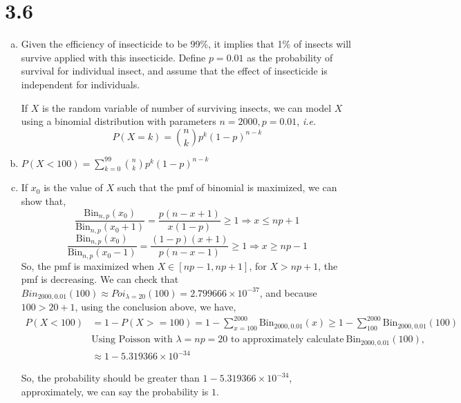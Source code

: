 \documentclass[letterpaper]{article}
\begin{document}
    \section*{3.6}
    \begin{enumerate}[(a)]
    \item Given the efficiency of insecticide to be 99\%, it implies that 1\% of insects will survive applied with this insecticide. Define $p = 0.01$ as the probability of survival for individual insect, and assume that the effect of insecticide is independent for individuals. 
    
    If $X$ is the random variable of number of surviving insects, we can model $X$ using a binomial distribution with parameters $n = 2000, p =0.01$, \emph{i.e.}
    \[
    P(X=k) = \binom{n}{k} p^k(1-p)^{n-k}
    \]
    \item $P(X < 100) = \sum_{k=0}^{99} \binom{n}{k} p^k(1-p)^{n-k}$
    \item If $x_0$ is the value of $X$ such that the pmf of binomial is maximized, we can show that,
    \[
    \frac{\text{Bin}_{n,p}(x_0)}{\text{Bin}_{n,p}(x_0+1)} = \frac{p(n-x+1)}{x(1-p)} \ge 1 \Rightarrow x \le np+1 
    \]
    \[
    \frac{\text{Bin}_{n,p}(x_0)}{\text{Bin}_{n,p}(x_0-1)} = \frac{(1-p)(x+1)}{p(n-x-1)} \ge 1 \Rightarrow x \ge np-1 
    \]
    So, the pmf is maximized when $X \in [np-1, np+1]$, for $X > np+1$, the pmf is decreasing.
    We can check that $Bin_{2000, 0.01}(100) \approx Poi_{\lambda=20}(100) = 2.799666 \times 10^{-37} $, and because $100 > 20 + 1$, using the conclusion above, we have,
    \begin{align*}
    P(X < 100) & = 1 - P(X >= 100) = 1 - \sum_{x=100}^{2000} \text{Bin}_{2000,0.01}(x) \ge 1 - \sum_{100}^{2000} \text{Bin}_{2000,0.01}(100) \\
    & \text{Using Poisson with $\lambda=np=20$ to approximately calculate}~\text{Bin}_{2000,0.01}(100),\\
    & \approx 1 - 5.319366 \times 10^{-34}
    \end{align*}

    So, the probability should be greater than $1 - 5.319366 \times 10^{-34}$, approximately, we can say the probability is $1$.
    \end{enumerate}
\end{document}
